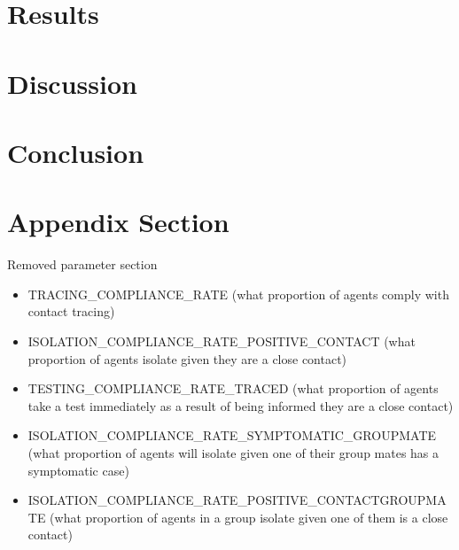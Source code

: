 \documentclass{article}
\begin{document}
\section{Results}

\section{Discussion}

\section{Conclusion}

\newpage
\appendix

\section{Appendix Section}

Removed parameter section
\begin{itemize}

\item TRACING\_COMPLIANCE\_RATE (what proportion of agents comply with contact tracing)
\item ISOLATION\_COMPLIANCE\_RATE\_POSITIVE\_CONTACT (what proportion of agents isolate given they are a close contact) 

\item TESTING\_COMPLIANCE\_RATE\_TRACED (what proportion of agents take a test immediately as a result of being informed they are a close contact)


\item ISOLATION\_COMPLIANCE\_RATE\_SYMPTOMATIC\_GROUPMATE (what proportion of agents will isolate given one of their group mates has a symptomatic case)

\item ISOLATION\_COMPLIANCE\_RATE\_POSITIVE\_CONTACTGROUPMATE (what proportion of agents in a group isolate given one of them is a close contact)
\end{itemize}

{}

\end{document}
